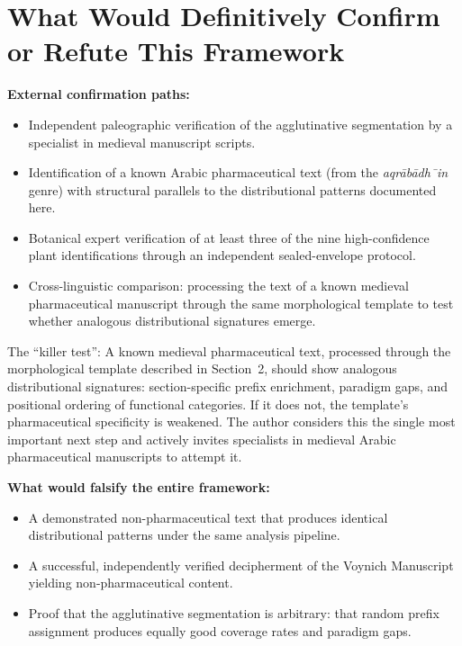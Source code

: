 \documentclass[11pt,a4paper]{article}
\begin{document}
\section{What Would Definitively Confirm or Refute This Framework}

\textbf{External confirmation paths:}
\begin{itemize}[leftmargin=2em]
\item Independent paleographic verification of the agglutinative segmentation by a specialist in medieval manuscript scripts.
\item Identification of a known Arabic pharmaceutical text (from the \textit{aqr\=ab\=adh\={\ i}n} genre) with structural parallels to the distributional patterns documented here.
\item Botanical expert verification of at least three of the nine high-confidence plant identifications through an independent sealed-envelope protocol.
\item Cross-linguistic comparison: processing the text of a known medieval pharmaceutical manuscript through the same morphological template to test whether analogous distributional signatures emerge.
\end{itemize}

The ``killer test'': A known medieval pharmaceutical text, processed through the morphological template described in Section~2, should show analogous distributional signatures: section-specific prefix enrichment, paradigm gaps, and positional ordering of functional categories. If it does not, the template's pharmaceutical specificity is weakened. The author considers this the single most important next step and actively invites specialists in medieval Arabic pharmaceutical manuscripts to attempt it.

\textbf{What would falsify the entire framework:}
\begin{itemize}[leftmargin=2em]
\item A demonstrated non-pharmaceutical text that produces identical distributional patterns under the same analysis pipeline.
\item A successful, independently verified decipherment of the Voynich Manuscript yielding non-pharmaceutical content.
\item Proof that the agglutinative segmentation is arbitrary: that random prefix assignment produces equally good coverage rates and paradigm gaps.
\end{itemize}
\end{document}
